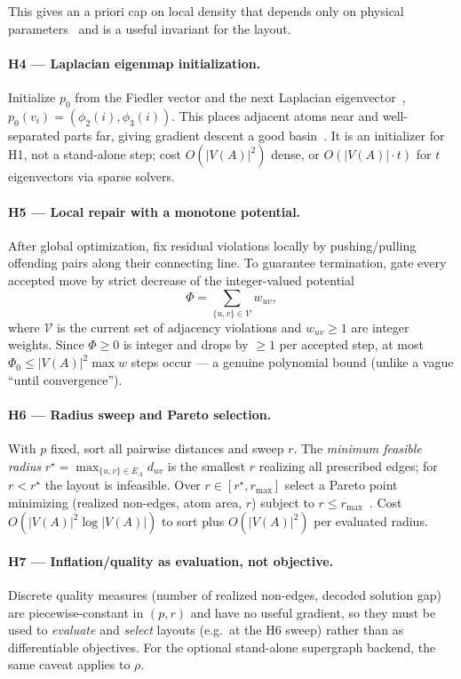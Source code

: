 \documentclass[11pt]{article}
\theoremstyle{definition}
\theoremstyle{remark}
\begin{document}
\noindent This gives an a priori cap on local density that depends only on physical
parameters~\cite{Henriet2021,Scholl2022} and is a useful invariant for the layout.

\paragraph{H4 --- Laplacian eigenmap initialization.} Initialize $p_0$ from the Fiedler
vector and the next Laplacian eigenvector~\cite{Fiedler1973,Chung1997,Belkin2003},
$p_0(v_i)=(\phi_2(i),\phi_3(i))$. This places adjacent atoms near and well-separated
parts far, giving gradient descent a good basin~\cite{Fruchterman1991}. It is an
initializer for H1, not a stand-alone step; cost $O(|V(A)|^2)$ dense, or $O(|V(A)|\cdot
t)$ for $t$ eigenvectors via sparse solvers.

\paragraph{H5 --- Local repair with a monotone potential.} After global optimization,
fix residual violations locally by pushing/pulling offending pairs along their
connecting line. To guarantee termination, gate every accepted move by strict decrease
of the integer-valued potential
\[
  \Phi = \sum_{\{u,v\}\in \mathcal{V}} w_{uv},
\]
where $\mathcal{V}$ is the current set of adjacency violations and $w_{uv}\ge 1$ are
integer weights. Since $\Phi\ge 0$ is integer and drops by $\ge 1$ per accepted step, at
most $\Phi_0\le |V(A)|^2\max w$ steps occur --- a genuine polynomial bound (unlike a
vague ``until convergence'').

\paragraph{H6 --- Radius sweep and Pareto selection.} With $p$ fixed, sort all pairwise
distances and sweep $r$. The \emph{minimum feasible radius}
$r^\star=\max_{\{u,v\}\in E_A}d_{uv}$ is the smallest $r$ realizing all prescribed
edges; for $r<r^\star$ the layout is infeasible. Over $r\in[r^\star,r_{\max}]$ select a
Pareto point minimizing (realized non-edges, atom area, $r$) subject to $r\le
r_{\max}$~\cite{Miettinen2014}. Cost $O(|V(A)|^2\log|V(A)|)$ to sort plus $O(|V(A)|^2)$
per evaluated radius.

\paragraph{H7 --- Inflation/quality as evaluation, not objective.} Discrete quality
measures (number of realized non-edges, decoded solution gap) are piecewise-constant in
$(p,r)$ and have no useful gradient, so they must be used to \emph{evaluate} and
\emph{select} layouts (e.g.\ at the H6 sweep) rather than as differentiable objectives.
For the optional stand-alone supergraph backend, the same caveat applies to $\rho$.
\end{document}
